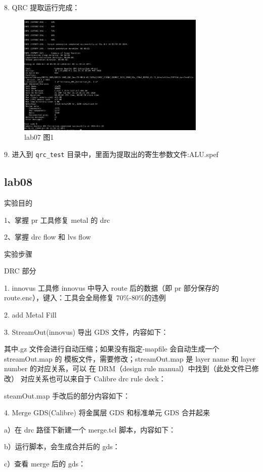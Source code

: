 8. QRC 提取运行完成：

\begin{figure}[H]
    \centering
    \includegraphics[width=0.8\textwidth]{images/lab07-01.png}
    \caption{lab07 图1}
\end{figure}

9. 进入到 \texttt{qrc\_test} 目录中，里面为提取出的寄生参数文件:ALU.spef

\subsection{lab08}

实验目的

1、掌握 pr 工具修复 metal 的 drc

2、掌握 drc flow 和 lvs flow

实验步骤

DRC 部分

1. innovus 工具修 innovus 中导入 route 后的数据（即 pr 部分保存的 route.enc），键入：工具会全局修复 70\%-80\%的违例

2. add Metal Fill

3. StreamOut(innovus) 导出 GDS 文件，内容如下：

其中.gz 文件会进行自动压缩；如果没有指定-mapfile 会自动生成一个 streamOut.map 的 模板文件，需要修改；streamOut.map 是 layer name 和 layer number 的对应关系，可以 在 DRM（design rule manual）中找到（此处文件已修改） 对应关系也可以来自于 Calibre drc rule deck：

steamOut.map 手改后的部分内容如下：

4. Merge GDS(Calibre) 将金属层 GDS 和标准单元 GDS 合并起来

a）在 drc 路径下新建一个 merge.tcl 脚本，内容如下：

b）运行脚本，会生成合并后的 gds：

c）查看 merge 后的 gds：

